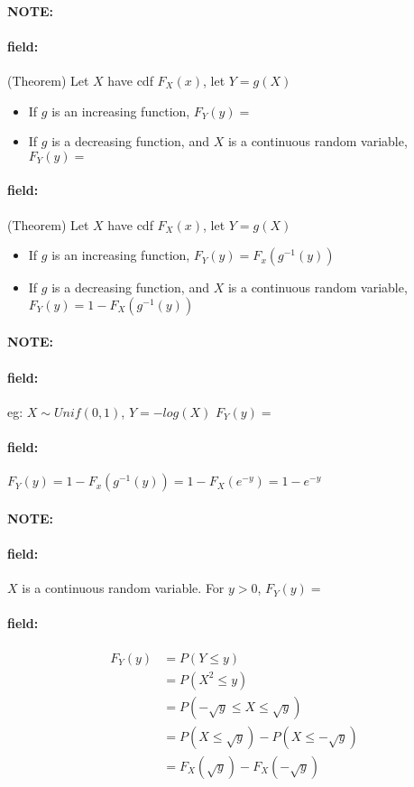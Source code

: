 \documentclass[12pt]{article}
\newenvironment{note}{\paragraph{NOTE:}}{}
\newenvironment{field}{\paragraph{field:}}{}
\begin{document}
\begin{note}
  \begin{field}
    (Theorem) Let $X$ have cdf $F_X(x)$, let $Y = g(X)$
    \begin{itemize}
      \item If $g$ is an increasing function, $F_Y(y) = $
      \item If $g$ is a decreasing function, and $X$ is a continuous random variable, $F_Y(y) = $
    \end{itemize}
  \end{field}
  \begin{field}
    (Theorem) Let $X$ have cdf $F_X(x)$, let $Y = g(X)$
    \begin{itemize}
      \item If $g$ is an increasing function, $F_Y(y) = F_x(g^{-1}(y))$
      \item If $g$ is a decreasing function, and $X$ is a continuous random variable, $F_Y(y) = 1 - F_X(g^{-1}(y))$
    \end{itemize}
  \end{field}
\end{note}

\begin{note}
  \begin{field}
    eg: $X \sim Unif(0,1)$, $Y = -log(X)$
    $F_Y(y) = $
  \end{field}
  \begin{field}
    $F_Y(y) = 1 - F_x(g^{-1}(y)) = 1 - F_X(e^{-y}) = 1 - e^{-y}$
  \end{field}
\end{note}


\begin{note}
  \begin{field}
    $X$ is a continuous random variable. For $y > 0$,
    $F_Y(y) = $
  \end{field}
  \begin{field}
    \begin{align*}
      F_Y(y) &= P(Y \leq y)\\
      &= P(X^2 \leq y)\\
      &= P(- \sqrt{y} \leq X \leq \sqrt{y})\\
      &= P(X \leq \sqrt{y}) - P(X \leq -\sqrt{y})\\
      &= F_X(\sqrt{y}) - F_X( - \sqrt{y})
    \end{align*}
  \end{field}
\end{note}
\end{document}
